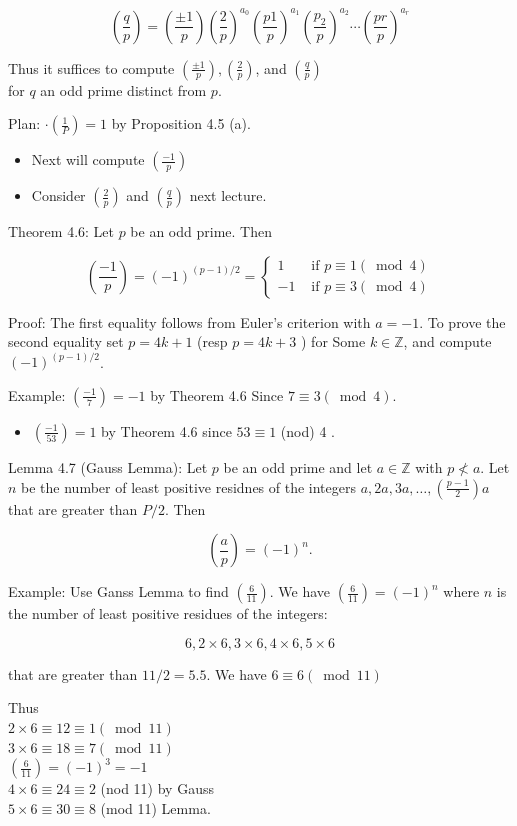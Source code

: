 \documentclass[10pt]{article}
\begin{document}
$$
\left(\frac{q}{p}\right)=\left(\frac{ \pm 1}{p}\right)\left(\frac{2}{p}\right)^{a_{0}}\left(\frac{p 1}{p}\right)^{a_{1}}\left(\frac{p_{2}}{p}\right)^{a_{2}} \cdots\left(\frac{p r}{p}\right)^{a_{r}}
$$

Thus it suffices to compute $\left(\frac{ \pm 1}{p}\right),\left(\frac{2}{p}\right)$, and $\left(\frac{q}{p}\right)$\\
for $q$ an odd prime distinct from $p$.

Plan: $\cdot\left(\frac{1}{P}\right)=1$ by Proposition 4.5 (a).

\begin{itemize}
  \item Next will compute $\left(\frac{-1}{p}\right)$
  \item Consider $\left(\frac{2}{p}\right)$ and $\left(\frac{q}{p}\right)$ next lecture.
\end{itemize}

Theorem 4.6: Let $p$ be an odd prime. Then

$$
\left(\frac{-1}{p}\right)=(-1)^{(p-1) / 2}=\left\{\begin{array}{cl}
1 & \text { if } p \equiv 1(\bmod 4) \\
-1 & \text { if } p \equiv 3(\bmod 4)
\end{array}\right.
$$

Proof: The first equality follows from Euler's criterion with $a=-1$. To prove the second equality set $p=4 k+1$ (resp $p=4 k+3$ ) for Some $k \in \mathbb{Z}$, and compute $(-1)^{(p-1) / 2}$.

Example: $\left(\frac{-1}{7}\right)=-1$ by Theorem 4.6 Since $7 \equiv 3(\bmod 4)$.

\begin{itemize}
  \item $\left(\frac{-1}{53}\right)=1$ by Theorem 4.6 since $53 \equiv 1$ (nod) 4 .
\end{itemize}

Lemma 4.7 (Gauss Lemma): Let $p$ be an odd prime and let $a \in \mathbb{Z}$ with $p \nless a$. Let $n$ be the number of least positive residnes of the integers $a, 2 a, 3 a, \ldots,\left(\frac{p-1}{2}\right) a$ that are greater than $P / 2$. Then

$$
\left(\frac{a}{p}\right)=(-1)^{n} .
$$

Example: Use Ganss Lemma to find $\left(\frac{6}{11}\right)$. We have $\left(\frac{6}{11}\right)=(-1)^{n}$ where $n$ is the number of least positive residues of the integers:

$$
6,2 \times 6,3 \times 6,4 \times 6,5 \times 6
$$

that are greater than $11 / 2=5.5$. We have $6 \equiv 6(\bmod 11)$

Thus\\
$2 \times 6 \equiv 12 \equiv 1(\bmod 11)$\\
$3 \times 6 \equiv 18 \equiv 7(\bmod 11)$\\
$\left(\frac{6}{11}\right)=(-1)^{3}=-1$\\
$4 \times 6 \equiv 24 \equiv 2$ (nod 11) by Gauss\\
$5 \times 6 \equiv 30 \equiv 8$ (mod 11) Lemma.
\end{document}
